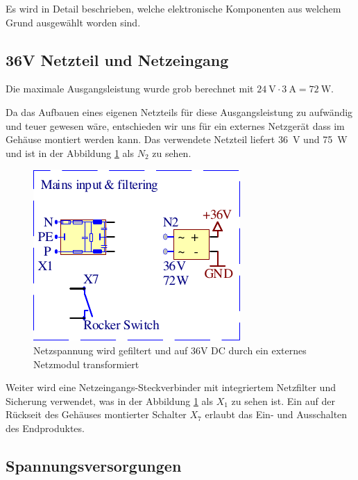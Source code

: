 Es wird  in  Detail  beschrieben,  welche  elektronische Komponenten aus welchem
Grund ausgew\"ahlt worden sind.

\subsection{36V Netzteil und Netzeingang}

Die  maximale Ausgangsleistung wurde grob berechnet  mit  $\SI{24}{\volt}  \cdot
\SI{3}{\ampere} = \SI{72}{\watt}$.

Da  das  Aufbauen  eines  eigenen  Netzteils  f\"ur  diese  Ausgangsleistung  zu
aufw\"andig und teuer gewesen w\"are, entschieden  wir  uns  f\"ur  ein externes
Netzger\"at dass im Geh\"ause  montiert  werden  kann.  Das  verwendete Netzteil
liefert  \SI{36}{\volt}   und   \SI{75}{\watt}   und   ist   in   der  Abbildung
\ref{fig:circuit:mains-input} als $N_2$ zu sehen.

\begin{figure}[th!]
    \center
    \includegraphics[width=.35\textwidth]{images/circuit/mains-input.pdf}
    \caption{Netzspannung wird gefiltert und auf 36V DC durch ein externes Netzmodul transformiert}
    \label{fig:circuit:mains-input}
\end{figure}

Weiter  wird  eine  Netzeingangs-Steckverbinder  mit integriertem Netzfilter und
Sicherung  verwendet,  was  in der Abbildung  \ref{fig:circuit:mains-input}  als
$X_1$  zu  sehen  ist. Ein auf der R\"uckseit des Geh\"auses montierter Schalter
$X_7$ erlaubt das Ein- und Ausschalten des Endproduktes.

\subsection{Spannungsversorgungen}

